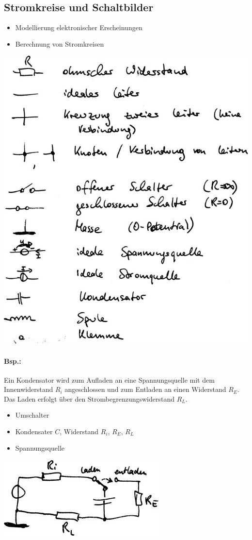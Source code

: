 \subsection{Stromkreise und Schaltbilder}
\begin{itemize}
\item Modellierung elektronischer Erscheinungen
\item Berechnung von Stromkreisen
\end{itemize}
\includegraphics[scale=.5]{Abbildungen/ABB207}

\paragraph{Bsp.:} Ein Kondensator wird zum Aufladen an eine Spannungsquelle mit dem Innenwiderstand $R_i$ angeschlossen und zum Entladen an einen Widerstand $R_E$. Das Laden erfolgt über den Strombegrenzungswiderstand $R_L$.
\begin{itemize}
\item Umschalter
\item Kondensater $C$, Widerstand $R_i$, $R_E$, $R_L$
\item Spannungsquelle
\end{itemize}
\includegraphics[scale=.75]{Abbildungen/ABB208}

